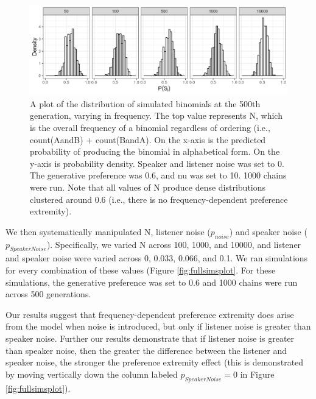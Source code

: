 \documentclass[10pt, letterpaper]{article}
\newenvironment{CodeChunk}{}{}
\begin{document}
\begin{CodeChunk}
\begin{figure}[tb]

{\centering \includegraphics[width=1\linewidth]{Figures/noNoise} 

}

\caption[A plot of the distribution of simulated binomials at the 500th generation, varying in frequency]{A plot of the distribution of simulated binomials at the 500th generation, varying in frequency. The top value represents N, which is the overall frequency of a binomial regardless of ordering (i.e., count(AandB) + count(BandA). On the x-axis is the predicted probability of producing the binomial in alphabetical form. On the y-axis is probability density. Speaker and listener noise was set to 0. The generative preference was 0.6, and nu was set to 10. 1000 chains were run. Note that all values of N produce dense distributions clustered around 0.6 (i.e., there is no frequency-dependent preference extremity).}\label{fig:noNoisePlot}
\end{figure}
\end{CodeChunk}

We then systematically manipulated N, listener noise (\(p_{noise}\)) and
speaker noise (\(p_{SpeakerNoise}\)). Specifically, we varied N across
100, 1000, and 10000, and listener and speaker noise were varied across
0, 0.033, 0.066, and 0.1. We ran simulations for every combination of
these values (Figure \ref{fig:fullsimsplot}. For these simulations, the
generative preference was set to 0.6 and 1000 chains were run across 500
generations.

Our results suggest that frequency-dependent preference extremity does
arise from the model when noise is introduced, but only if listener
noise is greater than speaker noise. Further our results demonstrate
that if listener noise is greater than speaker noise, then the greater
the difference between the listener and speaker noise, the stronger the
preference extremity effect (this is demonstrated by moving vertically
down the column labeled \(p_{SpeakerNoise} = 0\) in Figure
\ref{fig:fullsimsplot}).
\end{document}
